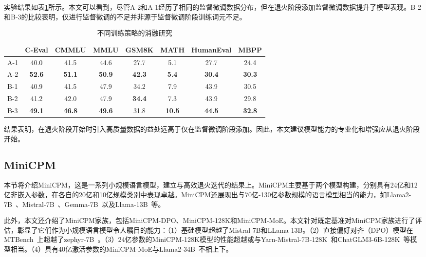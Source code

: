 实验结果如表\ref{tab:dataexperiments}所示。本文可以看到，尽管A-2和A-1经历了相同的监督微调数据分布，但在退火阶段添加监督微调数据提升了模型表现。B-2和B-3的比较表明，仅进行监督微调的不足并非源于监督微调阶段训练词元不足。 

\begin{table}[h]
\centering
\begin{tabular}{lccccccc}
\toprule
            & \textbf{C-Eval} & \textbf{CMMLU} & \textbf{MMLU} & \textbf{GSM8K} & \textbf{MATH} & \textbf{HumanEval} & \textbf{MBPP} \\ \midrule
A-1 & 40.0  & 41.5  & 44.6 & 27.7  & 5.1  & 27.7      & 24.4 \\
A-2 & \textbf{52.6}  & \textbf{51.1} & \textbf{50.9} & \textbf{42.3 } & \textbf{5.4}  & \textbf{30.4 }     & \textbf{30.3} \\
\midrule

B-1 &   40.9  & 41.5 & 47.9 &  34.2 & 7.9   &  43.9 & 30.5 \\
B-2 &  41.2 &  42.0 &    47.9  & \textbf{34.4} & 7.3 &  43.9 & 29.8  \\ 
B-3 & \textbf{49.1}  & \textbf{46.8}  & \textbf{49.6} & 31.8  & \textbf{10.5}  & \textbf{44.5}  & \textbf{32.8}\\
\bottomrule
\end{tabular}
\caption{不同训练策略的消融研究
}
\label{tab:dataexperiments}
\end{table}

结果表明，在退火阶段开始时引入高质量数据的益处远高于仅在监督微调阶段添加。因此，本文建议模型能力的专业化和增强应从退火阶段开始。 

\subsection{MiniCPM}


本节将介绍MiniCPM，这是一系列小规模语言模型，建立与高效退火迭代的结果上。MiniCPM主要基于两个模型构建，分别具有24亿和12亿非嵌入参数，在各自的20亿和10亿规模类别中表现卓越。MiniCPM还展现出与70亿-130亿参数规模的语言模型相当的能力，如Llama2-7B~\citep{touvron2023llama}、Mistral-7B~\citep{jiang2023mistral}、Gemma-7B~\citep{Banks2024Gemma}以及Llama-13B~\citep{touvron2023llama}等。

此外，本文还介绍了MiniCPM家族，包括MiniCPM-DPO、MiniCPM-128K和MiniCPM-MoE。本文针对既定基准对MiniCPM家族进行了评估，彰显了它们作为小规模语言模型令人瞩目的能力：（1）基础模型超越了Mistral-7B和LLama-13B。（2）直接偏好对齐（DPO）模型在MTBench~\citep{zheng2024judging}上超越了zephyr-7B~\citep{tunstall2023zephyr}。（3）24亿参数的MiniCPM-128K模型的性能超越或与Yarn-Mistral-7B-128K~\citep{peng2023yarn}和ChatGLM3-6B-128K~\citep{du2021glm}等模型相当。（4）具有40亿激活参数的MiniCPM-MoE与Llama2-34B~\citep{touvron2023llama}不相上下。

